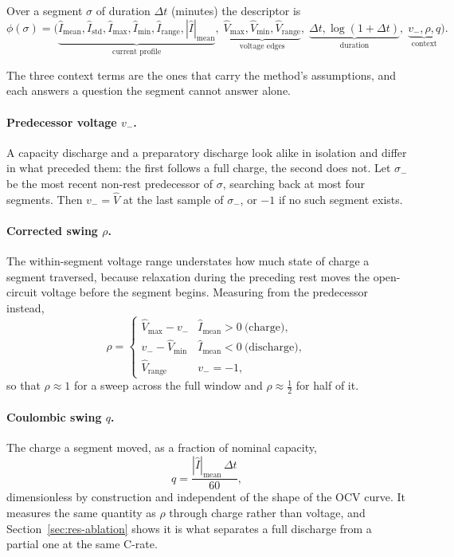 \documentclass[preprint,3p,number]{elsarticle}
\begin{document}
Over a segment $\sigma$ of duration $\Delta t$ (minutes) the descriptor is
\begin{equation}
\phi(\sigma) = \bigl(
\underbrace{\hat{I}_{\text{mean}}, \hat{I}_{\text{std}}, \hat{I}_{\max},
            \hat{I}_{\min}, \hat{I}_{\text{range}}, |\hat{I}|_{\text{mean}}}
           _{\text{current profile}},\;
\underbrace{\hat{V}_{\max}, \hat{V}_{\min}, \hat{V}_{\text{range}}}
           _{\text{voltage edges}},\;
\underbrace{\Delta t, \log(1+\Delta t)}_{\text{duration}},\;
\underbrace{v_{-}, \rho, q}_{\text{context}}
\bigr).
\label{eq:phi}
\end{equation}

The three context terms are the ones that carry the method's assumptions, and
each answers a question the segment cannot answer alone.

\paragraph{Predecessor voltage $v_{-}$.} A capacity discharge and a preparatory
discharge look alike in isolation and differ in what preceded them: the first
follows a full charge, the second does not. Let $\sigma_{-}$ be the most recent
non-rest predecessor of $\sigma$, searching back at most four segments. Then
$v_{-} = \hat{V}$ at the last sample of $\sigma_{-}$, or $-1$ if no such segment
exists.

\paragraph{Corrected swing $\rho$.} The within-segment voltage range
understates how much state of charge a segment traversed, because relaxation
during the preceding rest moves the open-circuit voltage before the segment
begins. Measuring from the predecessor instead,
\begin{equation}
\rho =
\begin{cases}
\hat{V}_{\max} - v_{-} & \hat{I}_{\text{mean}} > 0 \ \text{(charge)},\\
v_{-} - \hat{V}_{\min} & \hat{I}_{\text{mean}} < 0 \ \text{(discharge)},\\
\hat{V}_{\text{range}} & v_{-} = -1,
\end{cases}
\label{eq:rho}
\end{equation}
so that $\rho \approx 1$ for a sweep across the full window and $\rho \approx
\tfrac{1}{2}$ for half of it.

\paragraph{Coulombic swing $q$.} The charge a segment moved, as a fraction of
nominal capacity,
\begin{equation}
q = \frac{|\hat{I}|_{\text{mean}} \, \Delta t}{60},
\label{eq:q}
\end{equation}
dimensionless by construction and independent of the shape of the OCV curve.
It measures the same quantity as $\rho$ through charge rather than voltage, and
Section~\ref{sec:res-ablation} shows it is what separates a full discharge from
a partial one at the same C-rate.
\end{document}
